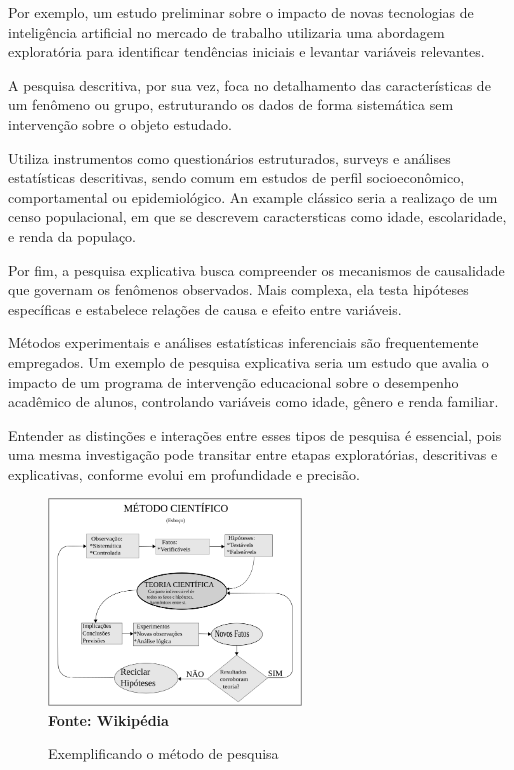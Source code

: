 Por exemplo, um estudo preliminar sobre o impacto de novas tecnologias de inteligência artificial no mercado de trabalho utilizaria uma abordagem exploratória para identificar tendências iniciais e levantar variáveis relevantes.

A pesquisa descritiva, por sua vez, foca no detalhamento das características de um fenômeno ou grupo, estruturando os dados de forma sistemática sem intervenção sobre o objeto estudado.

Utiliza instrumentos como questionários estruturados, surveys e análises estatísticas descritivas, sendo comum em estudos de perfil socioeconômico, comportamental ou epidemiológico. An example clássico seria a realizaço de um censo populacional, em que se descrevem caractersticas como idade, escolaridade, e renda da populaço.

Por fim, a pesquisa explicativa busca compreender os mecanismos de causalidade que governam os fenômenos observados. Mais complexa, ela testa hipóteses específicas e estabelece relações de causa e efeito entre variáveis.

Métodos experimentais e análises estatísticas inferenciais são frequentemente empregados. Um exemplo de pesquisa explicativa seria um estudo que avalia o impacto de um programa de intervenção educacional sobre o desempenho acadêmico de alunos, controlando variáveis como idade, gênero e renda familiar.

Entender as distinções e interações entre esses tipos de pesquisa é essencial, pois uma mesma investigação pode transitar entre etapas exploratórias, descritivas e explicativas, conforme evolui em profundidade e precisão.


\begin{figure}[ht]
	\centering	
	\caption[\hspace{0.1cm}Grade Computacional.]{Exemplificando o método de pesquisa}
	\vspace{-0.4cm}
	\includegraphics[width=0.6\textwidth]{figuras/metodo_cientifico.png}
	 \vspace{-0.2cm}
	\\\textbf{\footnotesize Fonte: Wikipédia }
	\label{fig:figura1}
\end{figure}
\vspace{-0.5cm}


